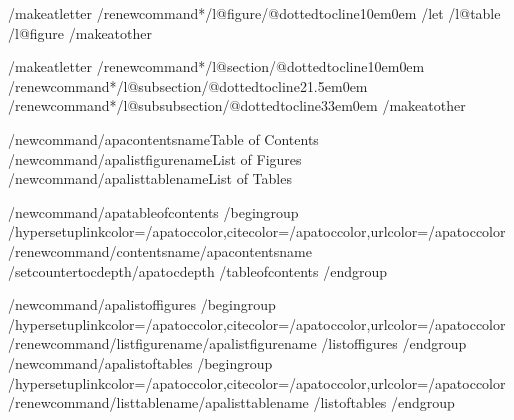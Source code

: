 %
/makeatletter
/renewcommand*/l@figure{/@dottedtocline{1}{0em}{0em}}
/let /l@table /l@figure
/makeatother

/makeatletter
/renewcommand*/l@section{/@dottedtocline{1}{0em}{0em}}
/renewcommand*/l@subsection{/@dottedtocline{2}{1.5em}{0em}}
/renewcommand*/l@subsubsection{/@dottedtocline{3}{3em}{0em}}
/makeatother

/newcommand{/apacontentsname}{Table of Contents}
/newcommand{/apalistfigurename}{List of Figures}
/newcommand{/apalisttablename}{List of Tables}

/newcommand{/apatableofcontents}{%
  /begingroup
  /hypersetup{linkcolor=/apatoccolor,citecolor=/apatoccolor,urlcolor=/apatoccolor}%
  /renewcommand{/contentsname}{/apacontentsname}%
  /setcounter{tocdepth}{/apatocdepth}%
  /tableofcontents
  /endgroup}

/newcommand{/apalistoffigures}{%
  /begingroup
  /hypersetup{linkcolor=/apatoccolor,citecolor=/apatoccolor,urlcolor=/apatoccolor}%
  /renewcommand{/listfigurename}{/apalistfigurename}%
  /listoffigures
  /endgroup}
/newcommand{/apalistoftables}{%
  /begingroup
  /hypersetup{linkcolor=/apatoccolor,citecolor=/apatoccolor,urlcolor=/apatoccolor}%
  /renewcommand{/listtablename}{/apalisttablename}%
  /listoftables
  /endgroup}

